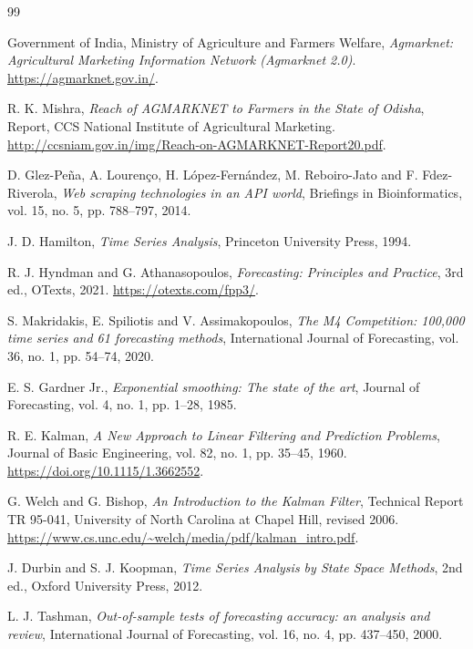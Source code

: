 \documentclass[12pt,a4paper,oneside]{report}
\numberwithin{equation}{chapter}
\numberwithin{figure}{chapter}
\numberwithin{table}{chapter}
\theoremstyle{definition}
\begin{document}
\begin{thebibliography}{99}

Government of India, Ministry of Agriculture and Farmers Welfare,
\emph{Agmarknet: Agricultural Marketing Information Network (Agmarknet 2.0)}.
\url{https://agmarknet.gov.in/}.

R. K. Mishra,
\emph{Reach of AGMARKNET to Farmers in the State of Odisha},
Report, CCS National Institute of Agricultural Marketing.
\url{http://ccsniam.gov.in/img/Reach-on-AGMARKNET-Report20.pdf}.

D. Glez-Pe\~na, A. Louren\c{c}o, H. L\'opez-Fern\'andez, M. Reboiro-Jato and F. Fdez-Riverola,
\emph{Web scraping technologies in an API world},
Briefings in Bioinformatics, vol. 15, no. 5, pp. 788--797, 2014.

J. D. Hamilton,
\emph{Time Series Analysis}, Princeton University Press, 1994.

R. J. Hyndman and G. Athanasopoulos,
\emph{Forecasting: Principles and Practice}, 3rd ed., OTexts, 2021.
\url{https://otexts.com/fpp3/}.

S. Makridakis, E. Spiliotis and V. Assimakopoulos,
\emph{The M4 Competition: 100,000 time series and 61 forecasting methods},
International Journal of Forecasting, vol. 36, no. 1, pp. 54--74, 2020.

E. S. Gardner Jr.,
\emph{Exponential smoothing: The state of the art},
Journal of Forecasting, vol. 4, no. 1, pp. 1--28, 1985.

R. E. Kalman,
\emph{A New Approach to Linear Filtering and Prediction Problems},
Journal of Basic Engineering, vol. 82, no. 1, pp. 35--45, 1960.
\url{https://doi.org/10.1115/1.3662552}.

G. Welch and G. Bishop,
\emph{An Introduction to the Kalman Filter},
Technical Report TR 95-041, University of North Carolina at Chapel Hill, revised 2006.
\url{https://www.cs.unc.edu/~welch/media/pdf/kalman_intro.pdf}.

J. Durbin and S. J. Koopman,
\emph{Time Series Analysis by State Space Methods}, 2nd ed., Oxford University Press, 2012.

L. J. Tashman,
\emph{Out-of-sample tests of forecasting accuracy: an analysis and review},
International Journal of Forecasting, vol. 16, no. 4, pp. 437--450, 2000.


\end{thebibliography}
\end{document}
